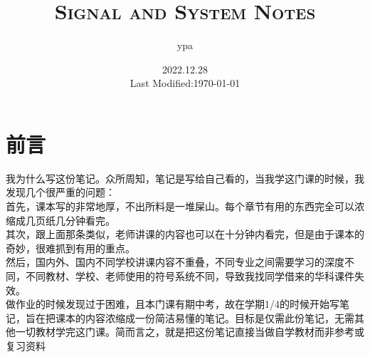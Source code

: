 \documentclass{article}
\title{\textsc{Signal and System Notes}}
\author{ypa}
\date{2022.12.28\\%
Last Modified:\today}
\begin{document}
\maketitle
\section{前言}
\noindent 我为什么写这份笔记。众所周知，笔记是写给自己看的，当我学这门课的时候，我发现几个很严重的问题：\\
首先，课本写的非常地厚，不出所料是一堆{\red 屎山}。每个章节有用的东西完全可以浓缩成几页纸几分钟看完。\\
其次，跟上面那条类似，老师讲课的内容也可以在十分钟内看完，但是由于课本的奇妙，很难抓到有用的重点。\\
然后，国内外、国内不同学校{\red 讲课内容不重叠}，不同专业之间需要学习的深度不同，不同教材、学校、老师使用的符号系统不同，导致我找同学借来的华科课件失效。\\
做作业的时候发现过于困难，且本门课有期中考，故在学期1/4的时候开始写笔记，旨在把课本的内容浓缩成一份简洁易懂的笔记。目标是{\red 仅需}此份笔记，无需其他一切教材学完这门课。简而言之，就是把这份笔记直接当做{\red 自学教材}而非参考或复习资料\\

\end{document}
